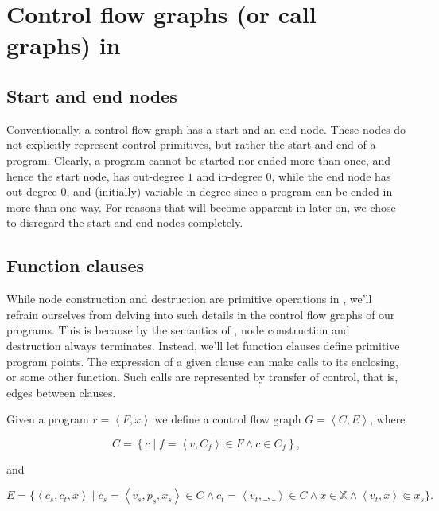 \section{Control flow graphs (or call graphs) in \D{}}

\subsection{Start and end nodes}

Conventionally, a control flow graph has a start and an end node. These nodes
do not explicitly represent control primitives, but rather the start and end of
a program. Clearly, a program cannot be started nor ended more than once, and
hence the start node, has out-degree $1$ and in-degree $0$, while the end node
has out-degree $0$, and (initially) variable in-degree since a program can be
ended in more than one way. For reasons that will become apparent in later on,
we chose to disregard the start and end nodes completely.

\subsection{Function clauses}

While node construction and destruction are primitive operations in \D{}, we'll
refrain ourselves from delving into such details in the control flow graphs of
our programs. This is because by the semantics of \D{}, node construction and
destruction always terminates. Instead, we'll let function clauses define
primitive program points. The expression of a given clause can make calls to
its enclosing, or some other function. Such calls are represented by transfer
of control, that is, edges between clauses.

\begin{definition}\label{definition:size-change-first-graph} Given a program
$r=\left\langle F,x \right\rangle$ we define a control flow graph $G =
\left\langle C, E \right\rangle$, where

$$C= \left\{ c \mid f= \left\langle v,C_f \right\rangle \in F \wedge c\in C_f
\right\},$$

and

$$E=\{ \left\langle c_s,c_t,x\right\rangle \mid c_s = \left\langle v_s, p_s,
x_s \right\rangle \in C \wedge c_t = \left\langle v_t, \_, \_ \right\rangle \in
C \wedge x\in\mathbb{X} \wedge \left\langle v_t, x \right\rangle \Subset x_s\}
.$$

\end{definition}

